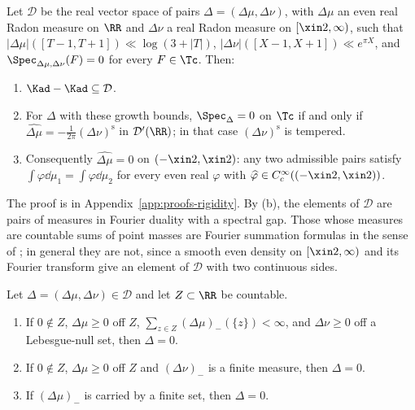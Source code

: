 \begin{lemma}\label{lem:homdir}
Let $\mathcal D$ be the real vector space of pairs $\Delta=(\Delta\mu,\Delta\nu)$, with $\Delta\mu$ an even real Radon measure
on $\RR$ and $\Delta\nu$ a real Radon measure on $[\xin2,\infty)$, such that $|\Delta\mu|([T-1,T+1])\ll\log(3+|T|)$,
$|\Delta\nu|([X-1,X+1])\ll e^{\pi X}$, and $\Spec_{\Delta\mu,\Delta\nu}(F)=0$ for every $F\in\Tc$. Then:
\begin{enumerate}[label=\textup{(\alph*)}]
\item $\Kad-\Kad\subseteq\mathcal D$.
\item For $\Delta$ with these growth bounds, $\Spec_\Delta=0$ on $\Tc$ if and only if $\widehat{\Delta\mu}=-\frac1{2\pi}(\Delta\nu)^{\mathrm s}$
in $\mathcal D'(\RR)$; in that case $(\Delta\nu)^{\mathrm s}$ is tempered.
\item Consequently $\widehat{\Delta\mu}=0$ on $(-\xin2,\xin2)$: any two admissible pairs satisfy $\int\varphi\dd\mu_1=\int\varphi\dd\mu_2$
for every even real $\varphi$ with $\widehat\varphi\in C_c^\infty((-\xin2,\xin2))$.
\end{enumerate}
\end{lemma}

The proof is in Appendix~\ref{app:proofs-rigidity}. By (b), the elements of $\mathcal D$ are pairs of measures in Fourier duality with a
spectral gap. Those whose measures are countable sums of point masses are Fourier summation formulas in the sense of
\cite{Gon23,GV25,Ved26}; in general they are not, since a smooth even density on $[\xin2,\infty)$ and its Fourier transform give an element
of $\mathcal D$ with two continuous sides.

\begin{proposition}\label{prop:rigidity}
Let $\Delta=(\Delta\mu,\Delta\nu)\in\mathcal D$ and let $Z\subset\RR$ be countable.
\begin{enumerate}[label=\textup{(\alph*)}]
\item If $0\notin Z$, $\Delta\mu\ge0$ off $Z$, $\sum_{z\in Z}(\Delta\mu)_-(\{z\})<\infty$, and $\Delta\nu\ge0$ off a
Lebesgue-null set, then $\Delta=0$.
\item If $0\notin Z$, $\Delta\mu\ge0$ off $Z$ and $(\Delta\nu)_-$ is a finite measure, then $\Delta=0$.
\item If $(\Delta\mu)_-$ is carried by a finite set, then $\Delta=0$.
\end{enumerate}
\end{proposition}

